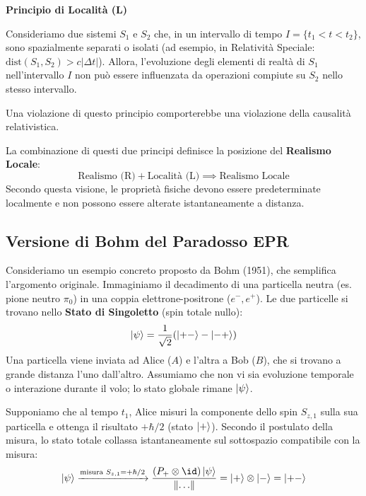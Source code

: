 \begin{definition}
    \textbf{Principio di Località (L)}
    
    Consideriamo due sistemi \( S_1 \) e \( S_2 \) che, in un intervallo di tempo \( I = \{ t_1 < t < t_2 \} \), sono spazialmente separati o isolati (ad esempio, in Relatività Speciale: \( \text{dist}(S_1, S_2) > c|\Delta t| \)).
    Allora, l'evoluzione degli elementi di realtà di \( S_1 \) nell'intervallo \( I \) non può essere influenzata da operazioni compiute su \( S_2 \) nello stesso intervallo.
    
    Una violazione di questo principio comporterebbe una violazione della causalità relativistica.
\end{definition}

La combinazione di questi due principi definisce la posizione del \textbf{Realismo Locale}:
\[
    \text{Realismo (R)} + \text{Località (L)} \implies \text{Realismo Locale}
\]
Secondo questa visione, le proprietà fisiche devono essere predeterminate localmente e non possono essere alterate istantaneamente a distanza.

\subsection{Versione di Bohm del Paradosso EPR}

Consideriamo un esempio concreto proposto da Bohm (1951), che semplifica l'argomento originale.
Immaginiamo il decadimento di una particella neutra (es. pione neutro $\pi_0$) in una coppia elettrone-positrone ($e^-, e^+$).
Le due particelle si trovano nello \textbf{Stato di Singoletto} (spin totale nullo):
\[
    \ket{\psi} = \frac{1}{\sqrt{2}} (\ket{+-} - \ket{-+})
\]
Una particella viene inviata ad Alice ($A$) e l'altra a Bob ($B$), che si trovano a grande distanza l'uno dall'altro. Assumiamo che non vi sia evoluzione temporale o interazione durante il volo; lo stato globale rimane $\ket{\psi}$.

Supponiamo che al tempo $t_1$, Alice misuri la componente dello spin $S_{z,1}$ sulla sua particella e ottenga il risultato $+\hbar/2$ (stato $\ket{+}$).
Secondo il postulato della misura, lo stato totale collassa istantaneamente sul sottospazio compatibile con la misura:
\[
    \ket{\psi} \xrightarrow{\text{misura } S_{z,1}=+\hbar/2} \frac{(P_+ \otimes \id)\ket{\psi}}{\norm{\dots}} = \ket{+} \otimes \ket{-} = \ket{+-}
\]

